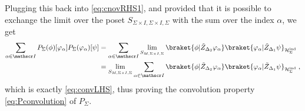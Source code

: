 \documentclass[11pt]{article}
\newcommand{\Hind}{\mathcal{H}_{\Sigma}^{\rm ind}}
\theoremstyle{definition}
\numberwithin{equation}{section}
\begin{document}
Plugging this back into \eqref{eq:cnovRHS1}, and provided that it is possible to exchange the limit over the poset $S_{\Sigma\times I,\Sigma\times I,\Sigma}$ with the sum over the index $\alpha$, we get
\begin{equation}
\begin{split}
    \sum_{\alpha\in\mathscr I}P_{\Sigma}(\phi)[\varphi_\alpha]P_{\Sigma}(\varphi_\alpha)[\psi]&=\sum_{\alpha\in\mathscr I}\lim_{S_{M,\Sigma\times I,\Sigma}}\braket{\phi|\tilde{Z}_{\Delta_{2}}\varphi_{\alpha}}\braket{\varphi_{\alpha}|\tilde{Z}_{\Delta_{1}}\psi}_{\Hind}\\
    &=\lim_{S_{M,\Sigma\times I,\Sigma}}\sum_{\alpha\in\mathscr I}\braket{\phi|\tilde{Z}_{\Delta_{2}}\varphi_{\alpha}}\braket{\varphi_{\alpha}|\tilde{Z}_{\Delta_{1}}\psi}_{\Hind}\;,
\end{split}
\end{equation}
which is exactly \eqref{eq:convLHS}, thus proving the convolution property \eqref{eq:Pconvolution} of $P_{\Sigma}$.

\medskip
\end{document}
